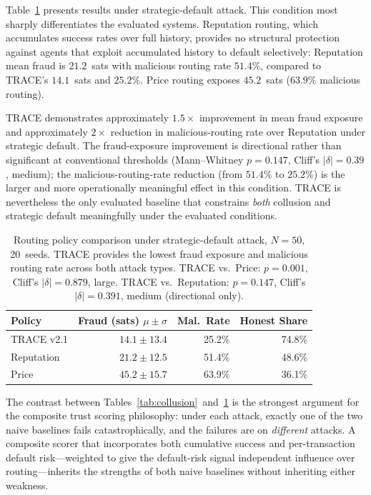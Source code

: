 \documentclass[sigconf,nonacm,10pt]{acmart}
\begin{document}
Table~\ref{tab:strategic} presents results under strategic-default
attack. This condition most sharply differentiates the evaluated
systems. Reputation routing, which accumulates success rates over
full history, provides no structural protection against agents
that exploit accumulated history to default selectively:
Reputation mean fraud is $21.2$~sats with malicious routing rate
$51.4\%$, compared to TRACE's $14.1$~sats and $25.2\%$. Price
routing exposes $45.2$~sats ($63.9\%$ malicious routing).

TRACE demonstrates approximately $1.5\times$ improvement in
mean fraud exposure and approximately $2\times$ reduction in
malicious-routing rate over Reputation under strategic default.
The fraud-exposure improvement is directional rather than
significant at conventional thresholds (Mann--Whitney $p = 0.147$,
Cliff's $|\delta| = 0.39$, medium); the malicious-routing-rate
reduction (from $51.4\%$ to $25.2\%$) is the larger and more
operationally meaningful effect in this condition. TRACE is
nevertheless the only evaluated baseline that constrains
\emph{both} collusion and strategic default meaningfully under
the evaluated conditions.

\begin{table}[t]
  \centering
  \caption{Routing policy comparison under strategic-default
    attack, $N{=}50$, 20~seeds. TRACE provides the lowest
    fraud exposure and malicious routing rate across both attack
    types. TRACE vs.~Price: $p = 0.001$, Cliff's $|\delta|=0.879$,
    large. TRACE vs.~Reputation: $p = 0.147$, Cliff's
    $|\delta| = 0.391$, medium (directional only).}
  \label{tab:strategic}
  \small
  \begin{tabular}{lrrr}
    \toprule
    Policy & Fraud (sats) $\mu \pm \sigma$
           & Mal.\ Rate & Honest Share \\
    \midrule
    TRACE v2.1      & $14.1 \pm 13.4$ & 25.2\% & 74.8\% \\
    Reputation      & $21.2 \pm 12.5$ & 51.4\% & 48.6\% \\
    Price           & $45.2 \pm 15.7$ & 63.9\% & 36.1\% \\
    \bottomrule
  \end{tabular}
\end{table}

The contrast between
Tables~\ref{tab:collusion}~and~\ref{tab:strategic} is the
strongest argument for the composite trust scoring philosophy:
under each attack, exactly one of the two naive baselines fails
catastrophically, and the failures are on \emph{different}
attacks. A composite scorer that incorporates both cumulative
success and per-transaction default risk---weighted to give the
default-risk signal independent influence over routing---inherits
the strengths of both naive baselines without inheriting either
weakness.
\end{document}
